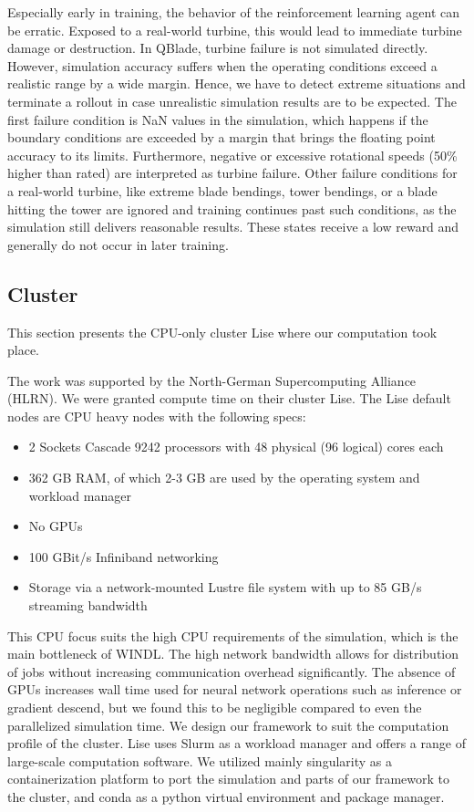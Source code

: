 Especially early in training, the behavior of the reinforcement learning agent can be erratic. Exposed to a real-world turbine, this would lead to immediate turbine damage or destruction. In QBlade, turbine failure is not simulated directly. However, simulation accuracy suffers when the operating conditions exceed a realistic range by a wide margin. Hence, we have to detect extreme situations and terminate a rollout in case unrealistic simulation results are to be expected. The first failure condition is NaN values in the simulation, which happens if the boundary conditions are exceeded by a margin that brings the floating point accuracy to its limits. Furthermore, negative or excessive rotational speeds (50\% higher than rated) are interpreted as turbine failure. Other failure conditions for a real-world turbine, like extreme blade bendings, tower bendings, or a blade hitting the tower are ignored and training continues past such conditions, as the simulation still delivers reasonable results. These states receive a low reward and generally do not occur in later training.

\subsection{Cluster}
\label{section:approach-cluster}

\begin{summary}
This section presents the CPU-only cluster Lise where our computation took place.
\end{summary}

The work was supported by the North-German Supercomputing Alliance (HLRN). We were granted compute time on their cluster Lise. The Lise default nodes are CPU heavy nodes with the following specs:

\begin{itemize}
  \item 2 Sockets Cascade 9242 processors with 48 physical (96 logical) cores each
  \item 362 GB RAM, of which 2-3 GB are used by the operating system and workload manager
  \item No GPUs
  \item 100 GBit/s Infiniband networking
  \item Storage via a network-mounted Lustre file system with up to 85 GB/s streaming bandwidth
\end{itemize}

This CPU focus suits the high CPU requirements of the simulation, which is the main bottleneck of \ac{WINDL}. The high network bandwidth allows for distribution of jobs without increasing communication overhead significantly. The absence of GPUs increases wall time used for neural network operations such as inference or gradient descend, but we found this to be negligible compared to even the parallelized simulation time. We design our framework to suit the computation profile of the cluster. Lise uses Slurm as a workload manager and offers a range of large-scale computation software. We utilized mainly singularity as a containerization platform to port the simulation and parts of our framework to the cluster, and conda as a python virtual environment and package manager. 

